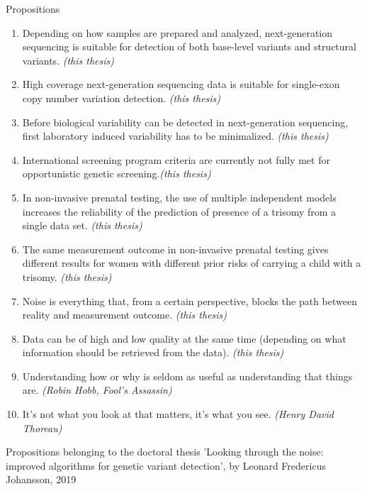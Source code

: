 \documentclass[10pt]{article}
\begin{document}
	\thispagestyle{empty}
	
	\Large
	Propositions
	
	\small
	
	\begin{enumerate}
		
		\item Depending on how samples are prepared and analyzed, next-generation sequencing is suitable for detection of both base-level variants and structural variants. \textsl{(this thesis)}
		
		\item High coverage next-generation sequencing data is suitable for single-exon copy number variation detection. \textsl{(this thesis)}
		
		\item Before biological variability can be detected in next-generation sequencing, first laboratory induced variability has to be minimalized. \textsl{(this thesis)}
		
		\item International screening program criteria  are currently not fully met for opportunistic genetic screening.\textsl{(this thesis)}
		
		\item In non-invasive prenatal testing, the use of multiple independent models increases the reliability of  the prediction of presence of a trisomy from a single data set. \textsl{(this thesis)}
		
		\item The same measurement outcome in non-invasive prenatal testing gives different results for women with different prior risks of carrying a child with a trisomy. \textsl{(this thesis)}
		
		\item Noise is everything that, from a certain perspective, blocks the path between reality and measurement outcome. \textsl{(this thesis)}
		
		\item Data can be of high and low quality at the same time (depending on what information should be retrieved from the data). \textsl{(this thesis)}
		
		\item Understanding how or why is seldom as useful as understanding that things are. \textsl{(Robin Hobb, Fool's Assassin)}
		
		\item It’s not what you look at that matters, it’s what you see. \textsl{(Henry David Thoreau)}
		
	\end{enumerate}
	
	\noindent
	Propositions belonging to the doctoral thesis 'Looking through the noise: improved algorithms for genetic variant detection', by Leonard Fredericus Johansson, 2019
	
\end{document}
